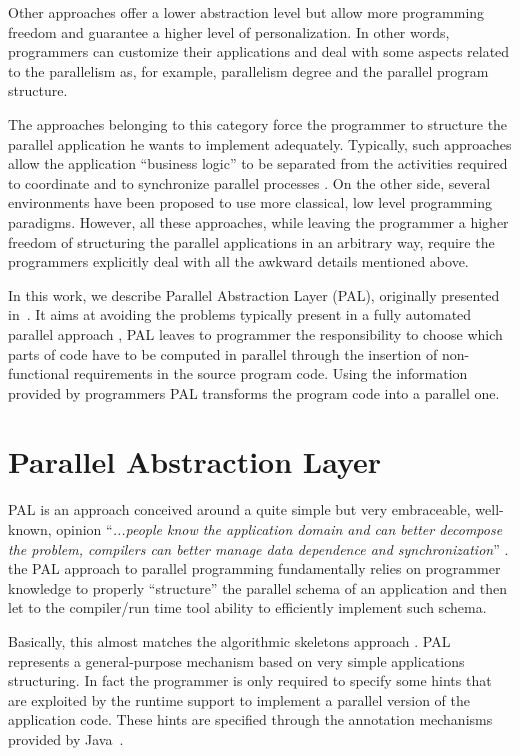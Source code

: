 \documentclass{acm_proc_article-sp}
\begin{document}
Other approaches offer a lower abstraction level but allow more programming freedom and guarantee a higher level of personalization.
In other words, programmers can customize their applications and deal with some aspects related to the parallelism as, for example, parallelism degree and the parallel program structure. 

The approaches belonging to this category force the programmer to structure the parallel application he wants to implement adequately. Typically, such approaches allow the application ``business logic'' to be separated from the activities required to coordinate and to synchronize parallel processes \cite{qosassist}.
On the other side, several environments have been proposed to use more classical, low level programming paradigms. However, all these approaches, while leaving the programmer a higher freedom of structuring the parallel applications in an arbitrary way, require the programmers explicitly deal with all the awkward details mentioned above.

In this work, we describe Parallel Abstraction Layer (PAL), originally presented in~\cite{danelutto2008pal}. It aims at avoiding the problems typically present in a fully automated parallel approach \cite{160438}, PAL leaves to programmer the responsibility to choose which parts of code have to be computed in parallel through the insertion of non-functional requirements in the source program code.
Using the information provided by programmers PAL transforms the program code into a parallel one.


\section{Parallel Abstraction Layer}\label{sec:idea}
PAL is an approach conceived around a quite simple but very embraceable, well-known, opinion ``\emph{...people know the application domain and can better decompose the problem, compilers can better manage data dependence and synchronization}'' \cite{grimshaw93mentat}. the PAL approach to parallel programming fundamentally relies on programmer knowledge to properly ``structure'' the parallel schema of an application and then let to the compiler/run time tool ability to efficiently implement such schema. 

Basically, this almost matches the algorithmic skeletons approach \cite{ColeCloset}. 
PAL represents a general-purpose mechanism based on very simple applications structuring. In fact the programmer is only required to specify some hints that are exploited by the runtime support to implement a parallel version of the application code. 
These hints are specified through the annotation mechanisms provided by Java~\cite{javaAnnotation}.
\end{document}
